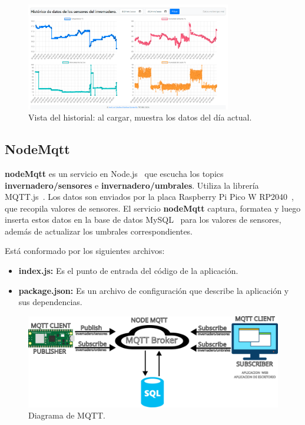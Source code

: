 \begin{figure}[h]
    \centering
    \includegraphics[width=0.8\textwidth]{img/desarrollo/Dashboard_Historico.png}
    \caption{Vista del historial: al cargar, muestra los datos del día actual.} \label{Img:Dashboard_Historico}
\end{figure}

\subsection{NodeMqtt}\label{proyecto:NodeMqtt}
\textbf{nodeMqtt} es un servicio en Node.js~\cite{misc:Nodejs} que escucha los topics \textbf{invernadero/sensores} e \textbf{invernadero/umbrales}. Utiliza la librería MQTT.js~\cite{misc:MQTTjs}. Los datos son enviados por la placa Raspberry Pi Pico W RP2040~\cite{misc:RPiPicoW}, que recopila valores de sensores. El servicio \textbf{nodeMqtt} captura, formatea y luego inserta estos datos en la base de datos MySQL~\cite{misc:Mysql} para los valores de sensores, además de actualizar los umbrales correspondientes.

Está conformado por los siguientes archivos:

\begin{itemize}
	\item \textbf{index.js:}
		Es el punto de entrada del código de la aplicación.
	\item \textbf{package.json:}
		Es un archivo de configuración que describe la aplicación y sus dependencias.
\end{itemize}

\begin{figure}[h]
	\centering
	\includegraphics[width=1\textwidth]{img/diagramas/mqtt_node.png}
	\caption{Diagrama de MQTT.}
\end{figure}


